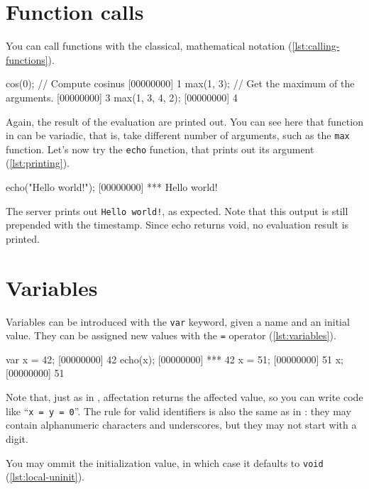 \documentclass[openright,twoside,12pt]{report}
\begin{document}
\section{Function calls}

You can call functions with the classical, mathematical notation
(\autoref{lst:calling-functions}).

\begin{urbiscript}[caption=Calling functions,label=lst:calling-functions]
cos(0); // Compute cosinus
[00000000] 1
max(1, 3); // Get the maximum of the arguments.
[00000000] 3
max(1, 3, 4, 2);
[00000000] 4
\end{urbiscript}

Again, the result of the evaluation are printed out. You can see here
that function in \urbi can be variadic, that is, take different number
of arguments, such as the \texttt{max} function. Let's now try the
\texttt{echo} function, that prints out its argument (\autoref{lst:printing}).

\begin{urbiscript}[caption=Printing out,label=lst:printing]
echo("Hello world!");
[00000000] *** Hello world!
\end{urbiscript}

The server prints out \texttt{Hello world!}, as expected. Note that
this output is still prepended with the timestamp. Since echo returns
void, no evaluation result is printed.

\section{Variables}

Variables can be introduced with the \texttt{var} keyword, given a
name and an initial value. They can be assigned new values with the
\texttt{=} operator (\autoref{lst:variables}).

\begin{urbiscript}[caption=Using variables,label=lst:variables]
var x = 42;
[00000000] 42
echo(x);
[00000000] *** 42
x = 51;
[00000000] 51
x;
[00000000] 51
\end{urbiscript}

Note that, just as in \Cxx, affectation returns the affected value, so
you can write code like ``\lstinline|x = y = 0|''. The rule for valid
identifiers is also the same as in \Cxx: they may contain alphanumeric
characters and underscores, but they may not start with a digit.

You may ommit the initialization value, in which case it defaults to
\lstinline|void| (\autoref{lst:local-uninit}).
\end{document}
